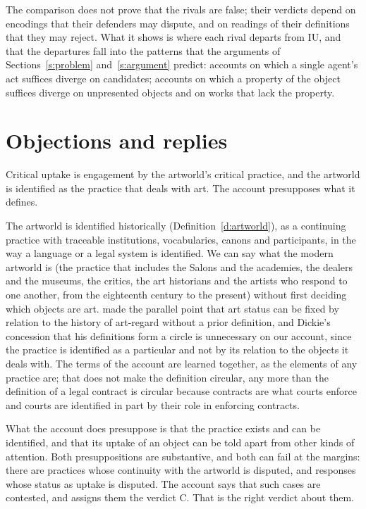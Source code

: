 \documentclass{situationist-preprint}
\begin{document}
The comparison does not prove that the rivals are false; their verdicts depend on encodings that their defenders may dispute, and on readings of their definitions that they may reject. What it shows is where each rival departs from IU, and that the departures fall into the patterns that the arguments of Sections~\ref{s:problem} and~\ref{s:argument} predict: accounts on which a single agent's act suffices diverge on candidates; accounts on which a property of the object suffices diverge on unpresented objects and on works that lack the property.

\section{Objections and replies}\label{s:objections}

\begin{objection}[Circularity]\label{o:circ}
Critical uptake is engagement by the artworld's critical practice, and the artworld is identified as the practice that deals with art. The account presupposes what it defines.
\end{objection}

\begin{reply}
The artworld is identified historically (Definition~\ref{d:artworld}), as a continuing practice with traceable institutions, vocabularies, canons and participants, in the way a language or a legal system is identified. We can say what the modern artworld is (the practice that includes the Salons and the academies, the dealers and the museums, the critics, the art historians and the artists who respond to one another, from the eighteenth century to the present) without first deciding which objects are art. \citet{Levinson1979} made the parallel point that art status can be fixed by relation to the history of art-regard without a prior definition, and Dickie's concession that his definitions form a circle \citep{Dickie1984} is unnecessary on our account, since the practice is identified as a particular and not by its relation to the objects it deals with. The terms of the account are learned together, as the elements of any practice are; that does not make the definition circular, any more than the definition of a legal contract is circular because contracts are what courts enforce and courts are identified in part by their role in enforcing contracts.

What the account does presuppose is that the practice exists and can be identified, and that its uptake of an object can be told apart from other kinds of attention. Both presuppositions are substantive, and both can fail at the margins: there are practices whose continuity with the artworld is disputed, and responses whose status as uptake is disputed. The account says that such cases are contested, and assigns them the verdict C. That is the right verdict about them.
\end{reply}
\end{document}
